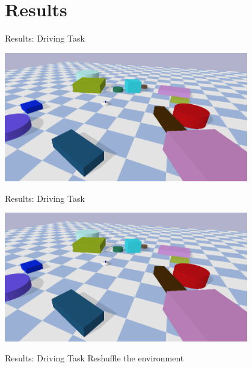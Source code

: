 \section{Results}
\begin{frame}[fragile]{Results: Driving Task} 
\begin{center}
 \includegraphics[width=0.8\textwidth]{figures/results/random1}
\end{center}
\end{frame}

\begin{frame}[fragile]{Results: Driving Task} 
\begin{center}
 \includegraphics[width=0.8\textwidth]{figures/results/random1}
\end{center}
\end{frame}

\begin{frame}[fragile]{Results: Driving Task} 
  Reshuffle the environment
\begin{figure}
  \centering
  \quad
\end{figure}
\end{frame}

